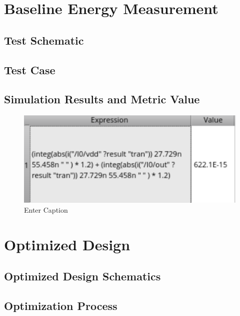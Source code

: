 \documentclass[12pt]{article}
\begin{document}
\newpage

\section{Baseline Energy Measurement}
\subsection{Test Schematic}



\newpage

\subsection{Test Case}



\newpage

\subsection{Simulation Results and Metric Value}

\begin{figure}[H]
    \centering
    \includegraphics[width=0.5\linewidth]{writeup//figures/baseline_energy_val.png}
    \caption{Enter Caption}
\end{figure}

\newpage

\section{Optimized Design}
\subsection{Optimized Design Schematics}



\newpage

\subsection{Optimization Process}
\end{document}
